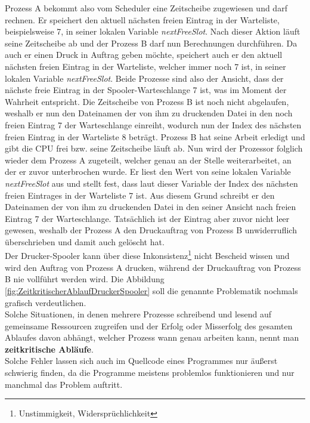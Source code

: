\begin{description}
						Prozess A bekommt also vom Scheduler eine Zeitscheibe zugewiesen und darf rechnen. Er speichert den aktuell nächsten freien Eintrag in der Warteliste, beispielsweise 7, in seiner lokalen Variable \textit{nextFreeSlot}. Nach dieser Aktion läuft seine Zeitscheibe ab und der Prozess B darf nun Berechnungen durchführen. Da auch er einen Druck in Auftrag geben möchte, speichert auch er den aktuell nächsten freien Eintrag in der Warteliste, welcher immer noch 7 ist, in seiner lokalen Variable \textit{nextFreeSlot}. Beide Prozesse sind also der Ansicht, dass der nächste freie Eintrag in der Spooler-Warteschlange 7 ist, was im Moment der Wahrheit entspricht. Die Zeitscheibe von Prozess B ist noch nicht abgelaufen, weshalb er nun den Dateinamen der von ihm zu druckenden Datei in den noch freien Eintrag 7 der Warteschlange einreiht, wodurch nun der Index des nächsten freien Eintrag in der Warteliste 8 beträgt. Prozess B hat seine Arbeit erledigt und gibt die CPU frei bzw. seine Zeitscheibe läuft ab. Nun wird der Prozessor folglich wieder dem Prozess A zugeteilt, welcher genau an der Stelle weiterarbeitet, an der er zuvor unterbrochen wurde. Er liest den Wert von seine lokalen Variable \textit{nextFreeSlot} aus und stellt fest, dass laut dieser Variable der Index des nächsten freien Eintrages in der Warteliste 7 ist. Aus diesem Grund schreibt er den Dateinamen der von ihm zu druckenden Datei in den seiner Ansicht nach freien Eintrag 7 der Warteschlange. Tatsächlich ist der Eintrag aber zuvor nicht leer gewesen, weshalb der Prozess A den Druckauftrag von Prozess B unwiderruflich überschrieben und damit auch gelöscht hat.\\
						Der Drucker-Spooler kann über diese Inkonsistenz\footnote{Unstimmigkeit, Widersprüchlichkeit} nicht Bescheid wissen und wird den Auftrag von Prozess A drucken, während der Druckauftrag von Prozess B nie vollführt werden wird. Die Abbildung \ref{fig:ZeitkritischerAblaufDruckerSpooler} soll die genannte Problematik nochmals grafisch verdeutlichen.\\
						Solche Situationen, in denen mehrere Prozesse schreibend und lesend auf gemeinsame Ressourcen zugreifen und der Erfolg oder Misserfolg des gesamten Ablaufes davon abhängt, welcher Prozess wann genau arbeiten kann, nennt man \textbf{zeitkritische Abläufe}.\\
						Solche Fehler lassen sich auch im Quellcode eines Programmes nur äußerst schwierig finden, da die Programme meistens problemlos funktionieren und nur manchmal das Problem auftritt. \cite{ModerneBetriebssysteme}
						

\end{description}

